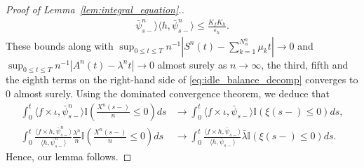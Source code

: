 \documentclass[a4paper,11pt,twoside]{article}
\numberwithin{equation}{section}
\numberwithin{figure}{section}
\theoremstyle{plain}
\newcommand{\CC}{\mathbb{C}}
\newcommand{\II}{\mathbb{I}}
\newcommand{\1}{\mathbbm{1}}
\begin{document}
\begin{proof}[Proof of Lemma~\ref{lem:integral_equation}.]
\begin{align*}
{    \bar{\psi}_{s-}^n\rangle}{\langle h, \bar{\psi}_{s-}^{n}\rangle}\leq \frac{K_fK_h}{\epsilon_h}.
\end{align*}
These bounds along with  $\sup_{0\leq t\leq T}n^{-1}|S^n(t)-\sum_{k=1}^{N^n_\alpha}\mu_kt|\to 0$ and $\sup_{0\leq t\leq T} n^{-1} |A^n(t)-\lambda^nt|\to 0$ almost surely as $n\to \infty$, the third, fifth and the eighth terms on the right-hand side of \eqref{eq:idle_balance_decomp} converges to 0 almost surely. Using the dominated convergence theorem, we deduce that 
\begin{align*}
    \int_0^t\langle f\times \iota, \bar{\psi}_{s-}^n \rangle \II\left(\frac{X^n(s-)}{n}\leq 0\right)ds &\to \int_0^t\langle f\times \iota, \bar{\psi}_{s-} \rangle \II\left(\xi(s-)\leq 0\right)ds,
    \\
    \int_0^t \frac{\langle f\times h, \bar{\psi}_{s-}^n\rangle}{\langle h, \bar{\psi}_{s-}^n\rangle}\frac{\lambda^n}{n}\II\left(\frac{X^n(s-)}{n}\leq 0\right)ds &\to \int_0^t \frac{\langle f\times h, \bar{\psi}_{s-}\rangle}{\langle h, \bar{\psi}_{s-}\rangle}\bar{\lambda}\II\left(\xi(s-)\leq 0\right)ds.
\end{align*}
Hence, our lemma follows. \end{proof}
\endproof


\end{document}
